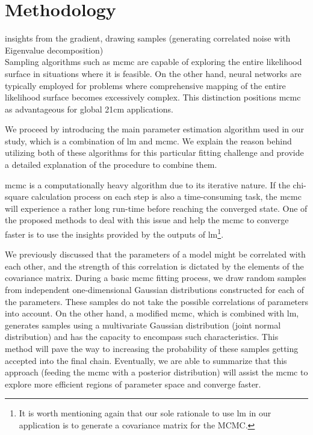 \documentclass[%
 reprint,
 amsmath,amssymb,
 aps,
]{revtex4-2}
\begin{document}
\section{Methodology}
\label{sec:method}
insights from the gradient, drawing samples (generating correlated noise with Eigenvalue decomposition)\\
 Sampling algorithms such as \gls{mcmc} are capable of exploring the entire likelihood surface in situations where it is feasible. On the other hand, neural networks are typically employed for problems where comprehensive mapping of the entire likelihood surface becomes excessively complex. This distinction positions \gls{mcmc} as advantageous for global 21cm applications.\par
We proceed by introducing the main parameter estimation algorithm used in our study, which is a combination of \gls{lm} and \gls{mcmc}. We explain the reason behind utilizing both of these algorithms for this particular fitting challenge and provide a detailed explanation of the procedure to combine them.\par
\gls{mcmc} is a computationally heavy algorithm due to its iterative nature. If the chi-square calculation process on each step is also a time-consuming task, the \gls{mcmc} will experience a rather long run-time before reaching the converged state. One of the proposed methods to deal with this issue and help the \gls{mcmc} to converge faster is to use the insights provided by the outputs of \gls{lm}\footnote{It is worth mentioning again that our sole rationale to use \gls{lm} in our application is to generate a covariance matrix for the MCMC.}.\par
We previously discussed that the parameters of a model might be correlated with each other, and the strength of this correlation is dictated by the elements of the covariance matrix. During a basic \gls{mcmc} fitting process, we draw random samples from independent one-dimensional Gaussian distributions constructed for each of the parameters. These samples do not take the possible correlations of parameters into account. On the other hand, a modified \gls{mcmc}, which is combined with \gls{lm}, generates samples using a multivariate Gaussian distribution (joint normal distribution) and has the capacity to encompass such characteristics. This method will pave the way to increasing the probability of these samples getting accepted into the final chain. Eventually, we are able to summarize that this approach (feeding the \gls{mcmc} with a posterior distribution) will assist the \gls{mcmc} to explore more efficient regions of parameter space and converge faster. \par
\end{document}
